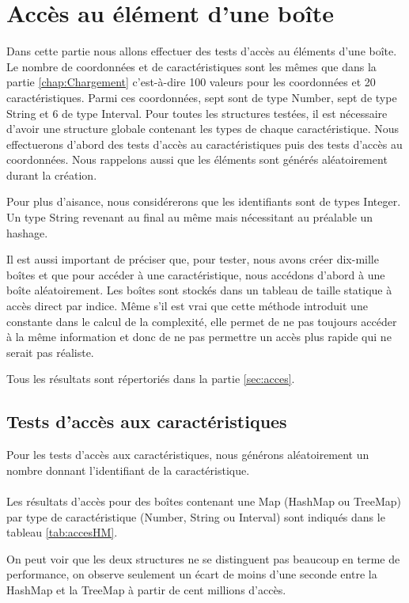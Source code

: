 \section{Accès au élément d'une boîte}
Dans cette partie nous allons effectuer des tests d'accès au éléments d'une boîte. Le nombre de coordonnées et de caractéristiques sont les mêmes que dans la partie \ref{chap:Chargement} c'est-à-dire 100 valeurs pour les coordonnées et 20 caractéristiques. Parmi ces coordonnées, sept sont de type Number, sept de type String et 6 de type Interval. Pour toutes les structures testées, il est nécessaire d'avoir une structure globale contenant les types de chaque caractéristique. Nous effectuerons d'abord des tests d'accès au caractéristiques puis des tests d'accès au coordonnées. Nous rappelons aussi que les éléments sont générés aléatoirement durant la création.

Pour plus d'aisance, nous considérerons que les identifiants sont de types Integer. Un type String revenant au final au même mais nécessitant au préalable un hashage.

Il est aussi important de préciser que, pour tester, nous avons créer dix-mille boîtes et que pour accéder à une caractéristique, nous accédons d'abord à une boîte aléatoirement. Les boîtes sont stockés dans un tableau de taille statique à accès direct par indice. Même s'il est vrai que cette méthode introduit une constante dans le calcul de la complexité, elle permet de ne pas toujours accéder à la même information et donc de ne pas permettre un accès plus rapide qui ne serait pas réaliste.

Tous les résultats sont répertoriés dans la partie \ref{sec:acces}.

\subsection{Tests d'accès aux caractéristiques}
Pour les tests d'accès aux caractéristiques, nous générons aléatoirement un nombre donnant l'identifiant de la caractéristique.

\paragraph{} Les résultats d'accès pour des boîtes contenant une Map (HashMap ou TreeMap) par type de caractéristique (Number, String ou Interval) sont indiqués dans le tableau \ref{tab:accesHM}.

On peut voir que les deux structures ne se distinguent pas beaucoup en terme de performance, on observe seulement un écart de moins d'une seconde entre la HashMap et la TreeMap à partir de cent millions d'accès.


